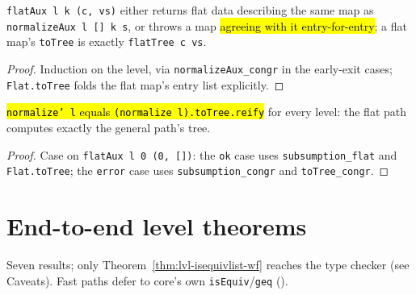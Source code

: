 \begin{theorem}
\label{thm:lvl-flataux-rep}
\leanok
{}
 \texttt{flatAux l k (c, vs)} either returns flat data describing the same map as
\texttt{normalizeAux l [] k s}, or throws a map \hl{agreeing with it entry-for-entry}; a flat map's
\texttt{toTree} is exactly \texttt{flatTree c vs}.
\end{theorem}
\begin{proof}
\leanok
{} Induction on the level, via \texttt{normalizeAux\_congr} in the early-exit cases;
\texttt{Flat.toTree} folds the flat map's entry list explicitly.
\end{proof}

\begin{theorem}
\label{thm:lvl-normalize-prime-eq}
\leanok
{}
 \hl{\texttt{normalize' l} equals \texttt{(normalize l).toTree.reify}} for every level:
the flat path computes exactly the general path's tree.
\end{theorem}
\begin{proof}
\leanok
{} Case on \texttt{flatAux l 0 (0, [])}: the \texttt{ok} case uses \texttt{subsumption\_flat}
and \texttt{Flat.toTree}; the \texttt{error} case uses \texttt{subsumption\_congr} and
\texttt{toTree\_congr}.
\end{proof}

\section{End-to-end level theorems}

Seven results; only Theorem~\ref{thm:lvl-isequivlist-wf} reaches the type checker (see Caveats). Fast
paths defer to core's own \texttt{isEquiv}/\texttt{geq}
().

